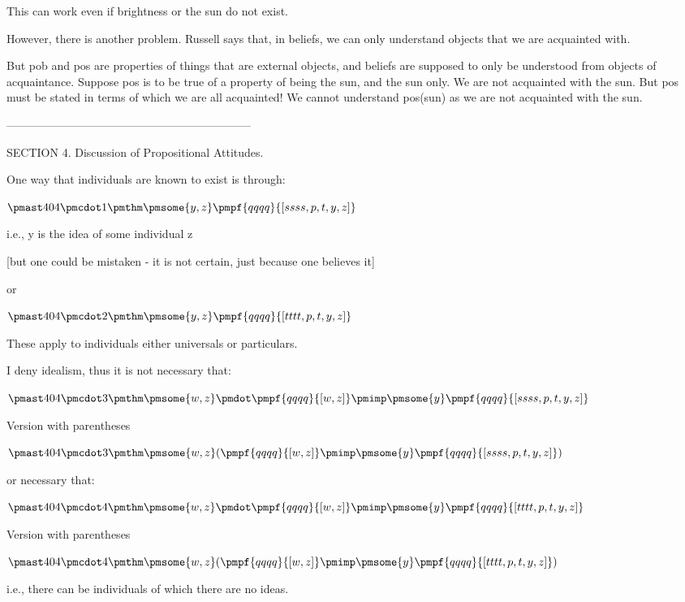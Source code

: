 \documentclass[12pt]{article}
\begin{document}
This can work even if brightness or the sun do not exist.

However, there is another problem. Russell says that, in beliefs, we can only understand objects that we are acquainted with. 

But pob and pos are properties of things that are external objects, and beliefs are supposed to only be understood from objects of acquaintance. Suppose pos is to be true of a property of being the sun, and the sun only. We are not acquainted with the sun. But pos must be stated in terms of which we are all acquainted! We cannot understand pos(sun) as we are not acquainted with the sun.

-----------------------------------------------------------------

SECTION 4. Discussion of Propositional Attitudes.

One way that individuals are known to exist is through:

$\pmast 404 \pmcdot 1 \pmthm \pmsome{y,z} \pmpf{qqqq}{[ssss,p,t,y,z]}$

i.e., y is the idea of some individual z

[but one could be mistaken - it is not certain, just because one believes it]

or

$\pmast 404 \pmcdot 2 \pmthm \pmsome{y,z} \pmpf{qqqq}{[tttt,p,t,y,z]}$

These apply to individuals either universals or particulars.

I deny idealism, thus it is not necessary that:

$\pmast 404 \pmcdot 3 \pmthm \pmsome{w,z} \pmdot \pmpf{qqqq}{[w, z]} \pmimp \pmsome{y} \pmpf{qqqq}{[ssss,p,t,y,z]}$
 
 

Version with parentheses

$\pmast 404 \pmcdot 3 \pmthm \pmsome{w,z}  (  \pmpf{qqqq}{[w, z]} \pmimp \pmsome{y} \pmpf{qqqq}{[ssss,p,t,y,z]})$


or necessary that:

$\pmast 404 \pmcdot 4 \pmthm \pmsome{w,z} \pmdot \pmpf{qqqq}{[w, z]} \pmimp \pmsome{y} \pmpf{qqqq}{[tttt,p,t,y,z]}$
 
 

Version with parentheses

$\pmast 404 \pmcdot 4 \pmthm \pmsome{w,z}  (  \pmpf{qqqq}{[w, z]} \pmimp \pmsome{y} \pmpf{qqqq}{[tttt,p,t,y,z]})$


i.e., there can be individuals of which there are no ideas.
\end{document}
